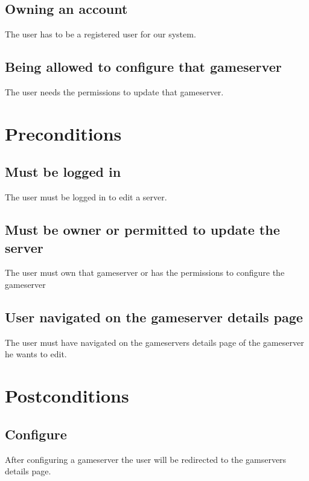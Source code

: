 \documentclass[a4paper,12pt,chapterprefix=false,bibliography=totoc,listof=totoc,]{scrreprt}
\begin{document}
\section{Owning an account}
The user has to be a registered user for our system.

\section{Being allowed to configure that gameserver}
The user needs the permissions to update that gameserver.

\chapter{Preconditions}
\section{Must be logged in}
The user must be logged in to edit a server.

\section{Must be owner or permitted to update the server}
The user must own that gameserver or has the permissions to configure the gameserver

\section{User navigated on the gameserver details page}
The user must have navigated on the gameservers details page of the gameserver he wants to edit.

\chapter{Postconditions}

\section{Configure}
After configuring a gameserver the user will be redirected to the gamservers details page.
\end{document}
